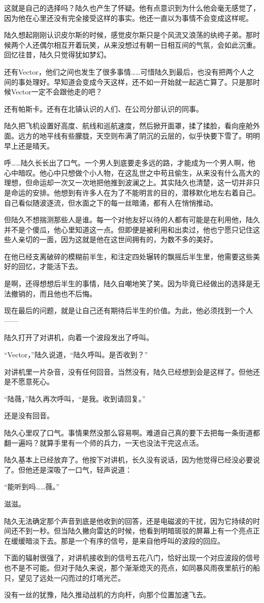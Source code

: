 这就是自己的选择吗？陆久也产生了怀疑。他有点意识到为什么他会毫无感觉了，因为他在心里还没有完全接受这样的事实。他还一直以为事情不会变成这样呢。

陆久想起刚刚认识皮尔斯的时候，感觉皮尔斯只是个风流又浪荡的纨绔子弟。那时候两个人还偶尔相互开着玩笑，从来没想过有朝一日相互间的气氛，会如此沉重。回忆往昔，陆久只觉得犹如梦幻。

还有Vector，他们之间也发生了很多事情……可惜陆久到最后，也没有把两个人之间的事处理好。早知道会变成今天这样，还不如一开始就一起逃亡算了。只是那时候Vector一定不会跟他走的吧？

还有帕斯卡。还有在北镇认识的人们、在公司分部认识的同事。

陆久把飞机设置好高度、航线和巡航速度，然后掀开面罩，揉了揉脸，看向座舱外面。远方的地平线有些朦胧，天空则布满了阴沉的云层的，似乎快要下雪了。明明早上还是晴天。

呼……陆久长长出了口气。一个男人到底要走多远的路，才能成为一个男人啊，他心中暗叹。他心中只想做个小人物，在这乱世之中苟且偷生，从来没有什么高大的理想，但命运却一次又一次地把他推到波澜之上。其实陆久也清楚，这一切并非只是命运的安排。他想到有许多人在为了不能明言的目的，潜移默化地左右着自己。自己看似随波逐流，但水面之下的每一丝暗涌，都有人在悄悄推动。

但陆久不想揣测那些人是谁。每一个对他友好以待的人都有可能是在利用他，陆久并不是个傻瓜，他心里知道这一点。但即便是被利用和出卖过，他也宁愿只记住这些人亲切的一面，因为这就是他在这世间拥有的，为数不多的美好。

在他已经支离破碎的模糊前半生，和注定四处辗转的飘摇后半生里，他需要这些美好的回忆，才能活下去。

是啊，还得想想后半生的事情，陆久自嘲地笑了笑。因为毕竟已经做出的选择是无法撤销的，而且他也不后悔。

现在最后的问题，就是让自己还有期待后半生的价值。为此，他必须找到一个人——

陆久打开了对讲机，向着一个波段发出了呼叫。

“Vector，”陆久说道，“陆久呼叫。是否收到？”

对讲机里一片杂音，没有任何回音。当然没有，陆久已经想到会是这样了。但他还是不愿意死心。

“陆薇，”陆久再次呼叫，“是我。收到请回复。”

还是没有回音。

陆久心里叹了口气。事情果然没那么容易啊。难道自己真的要下去把每一条街道都翻一遍吗？就算手里有一个师的兵力，一天也没法干完这点活。

陆久基本上已经放弃了。他按下对讲机，长久没有说话，因为他觉得已经没必要说了。但他还是深吸了一口气，轻声说道：

“能听到吗……薇。”

滋滋。

陆久无法确定那个声音到底是他收到的回答，还是电磁波的干扰，因为它持续的时间还不到一秒。但当陆久撇向雷达的时候，他看到明暗斑驳的屏幕上有一个亮点正在缓缓暗淡下去。那是一个有序的信号，是来自他呼叫的波段的回应。

下面的辐射很强了，对讲机接收到的信号五花八门，恰好出现一个对应波段的信号也不是不可能。但对于陆久来说，那个渐渐熄灭的亮点，如同暴风雨夜里航行的船只，望见了远处一闪而过的灯塔光芒。

没有一丝的犹豫，陆久推动战机的方向杆，向那个位置加速飞去。